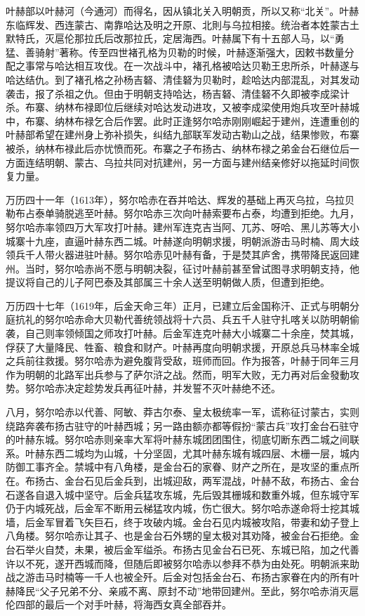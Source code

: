 叶赫部以叶赫河（今通河）而得名，因从镇北关入明朝贡，所以又称“北关”。叶赫东临辉发、西连蒙古、南靠哈达及明之开原、北則与乌拉相接。统治者本姓蒙古土默特氏，灭扈伦那拉氏后改那拉氏，定居海西。叶赫属下有十五部人马，以“勇猛、善骑射”著称。传至四世褚孔格为贝勒的时候，叶赫逐渐强大，因敕书数量分配之事常与哈达相互攻伐。在一次战斗中，褚孔格被哈达贝勒王忠所杀，叶赫遂与哈达结仇。到了褚孔格之孙杨吉砮、清佳砮为贝勒时，趁哈达内部混乱，对其发动袭击，报了杀祖之仇。但由于明朝支持哈达，杨吉砮、清佳砮不久即被李成梁计杀。布寨、纳林布禄即位后继续对哈达发动进攻，又被李成梁使用炮兵攻至叶赫城中，布寨、纳林布禄乞合后作罢。此时正逢努尔哈赤刚刚崛起于建州，连遭重创的叶赫部希望在建州身上弥补损失，纠结九部联军发动古勒山之战，结果惨败，布寨被杀，纳林布禄此后亦忧愤而死。布寨之子布扬古、纳林布禄之弟金台石继位后一方面连结明朝、蒙古、乌拉共同对抗建州，另一方面与建州结亲修好以拖延时间恢复力量。

万历四十一年（1613年），努尔哈赤在吞并哈达、辉发的基础上再灭乌拉，乌拉贝勒布占泰单骑脱逃至叶赫。努尔哈赤三次向叶赫索要布占泰，均遭到拒绝。九月，努尔哈赤率领四万大军攻打叶赫。建州军连克吉当阿、兀苏、呀哈、黑儿苏等大小城寨十九座，直逼叶赫东西二城。叶赫遂向明朝求援，明朝派游击马时楠、周大歧领兵千人带火器进驻叶赫。努尔哈赤见叶赫有备，于是焚其庐舍，携带降民返回建州。当时，努尔哈赤尚不愿与明朝决裂，征讨叶赫前甚至曾试图寻求明朝支持，他提议将自己的儿子阿巴泰及其部属三十余人送至明朝做人质，但遭到拒绝。

万历四十七年（1619年，后金天命三年）正月，已建立后金国称汗、正式与明朝分庭抗礼的努尔哈赤命大贝勒代善统领战将十六员、兵五千人驻守扎喀关以防明朝偷袭，自己则率领倾国之师攻打叶赫。后金军连克叶赫大小城寨二十余座，焚其城，俘获了大量降民、牲畜、粮食和财产。叶赫再度向明朝求援，开原总兵马林率全城之兵前往救援。努尔哈赤为避免腹背受敌，班师而回。作为报答，叶赫于同年三月作为明朝的北路军出兵参与了萨尔浒之战。然而，明军大败，无力再对后金發動攻势。努尔哈赤决定趁势发兵再征叶赫，并发誓不灭叶赫绝不还。

八月，努尔哈赤以代善、阿敏、莽古尔泰、皇太极统率一军，谎称征讨蒙古，实则绕路奔袭布扬古驻守的叶赫西城；另一路由额亦都等假扮“蒙古兵”攻打金台石驻守的叶赫东城。努尔哈赤则亲率大军将叶赫东城团团围住，彻底切断东西二城之间联系。叶赫东西二城均为山城，十分坚固，尤其叶赫东城有城四层、木栅一层，城内防御工事齐全。禁城中有八角楼，是金台石的家眷、财产之所在，是攻坚的重点所在。布扬古、金台石见后金兵到，出城迎敌，两军混战，叶赫不敌，布扬古、金台石遂各自退入城中坚守。后金兵猛攻东城，先后毁其栅城和数重外城，但东城守军仍于内城死战，后金军不断用云梯猛攻内城，伤亡很大。努尔哈赤遂命将士挖其城墙，后金军冒着飞矢巨石，终于攻破内城。金台石见内城被攻陷，带妻和幼子登上八角楼。努尔哈赤让其子、也是金台石外甥的皇太极对其劝降，被金台石拒绝。金台石举火自焚，未果，被后金军缢杀。布扬古见金台石已死、东城已陷，加之代善许以不死，遂开西城而降，但随后即被努尔哈赤以参拜不恭为由处死。明朝派来助战之游击马时楠等一千人也被全歼。后金对包括金台石、布扬古家眷在内的所有叶赫降民“父子兄弟不分、亲戚不离、原封不动”地带回建州。至此，努尔哈赤消灭扈伦四部的最后一个对手叶赫，将海西女真全部吞并。

